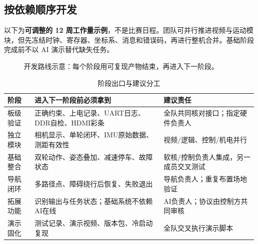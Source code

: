 \documentclass[UTF8,a4paper,zihao=-4,fontset=fandol]{ctexart}
\begin{document}
\subsection{按依赖顺序开发}

以下为\textbf{可调整的 12 周工作量示例}，不是比赛日程。团队可并行推进视频与运动模块，但先冻结时钟、寄存器、坐标系、消息和错误码，再进行整机合并。基础阶段完成前不以 AI 演示替代缺失任务。

\begin{figure}[H]\centering
{}
\caption{开发路线示意：每个阶段用可复现产物结束，再进入下一阶段。}\label{fig:roadmap}
\end{figure}

\begin{table}[H]\small
\caption{阶段出口与建议分工}
\begin{tabularx}{\linewidth}{@{}L{2.5cm}Y L{3.7cm}@{}}\toprule
\textbf{阶段} & \textbf{进入下一阶段前必须拿到} & \textbf{建议责任}\\\midrule
板级验证 & 正确约束、上电记录、UART日志、DDR自检、HDMI彩条 & 全队共同核对接口；指定硬件负责人\\
独立模块 & 相机显示、单轮闭环、IMU原始数据、测距有效性 & 视频/逻辑、控制/机电并行\\
基础整合 & 双轮动作、姿态叠加、减速停车、故障状态 & 软核/控制负责人集成，另一成员交叉测试\\
导航闭环 & 多路径点、障碍绕行后恢复、失败退出 & 导航负责人；重复布置场地验证\\
拓展功能 & 识别输出与任务状态；基础系统不依赖AI在线 & AI负责人；协议由控制方共同审核\\
演示固化 & 测试记录、演示视频、版本包、冷启动复现 & 全队交叉执行演示脚本\\\bottomrule
\end{tabularx}
\end{table}
\end{document}
